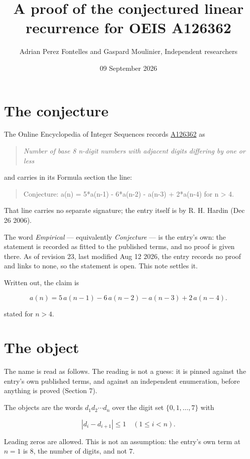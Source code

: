 \documentclass[11pt]{article}
\title{A proof of the conjectured linear recurrence for OEIS A126362}
\author{Adrian Perez Fontelles and Gaspard Moulinier, Independent researchers}
\date{09 September 2026}
\theoremstyle{definition}
\begin{document}
\maketitle
\section{The conjecture}

The Online Encyclopedia of Integer Sequences records \href{https://oeis.org/A126362}{A126362} as

\begin{quote}\itshape Number of base 8 n-digit numbers with adjacent digits differing by one or less\end{quote}

and carries in its Formula section the line:

\begin{quote}\ttfamily Conjecture: a(n) = 5*a(n-1) - 6*a(n-2) - a(n-3) + 2*a(n-4) for n > 4.\end{quote}

That line carries no separate signature; the entry itself is by R. H. Hardin (Dec 26 2006).

The word {\itshape Empirical} --- equivalently {\itshape Conjecture} --- is the entry's own: the statement is recorded as fitted to the published terms, and no proof is given there. As of revision 23, last modified Aug 12 2026, the entry records no proof and links to none, so the statement is open. This note settles it.

Written out, the claim is

\[a(n) = 5\,a(n-1) - 6\,a(n-2) - a(n-3) + 2\,a(n-4).\]

stated for $n > 4$.

\section{The object}

The name is read as follows. The reading is not a guess: it is pinned against the entry's own published terms, and against an independent enumeration, before anything is proved (Section 7).

The objects are the words $d_1 d_2 \cdots d_n$ over the digit set $\{0,1,\dots,7\}$ with

\[|d_i - d_{i+1}| \le 1\quad (1 \le i < n).\]

Leading zeros are allowed. This is not an assumption: the entry's own term at $n=1$ is $8$, the number of digits, and not $7$.
\end{document}
